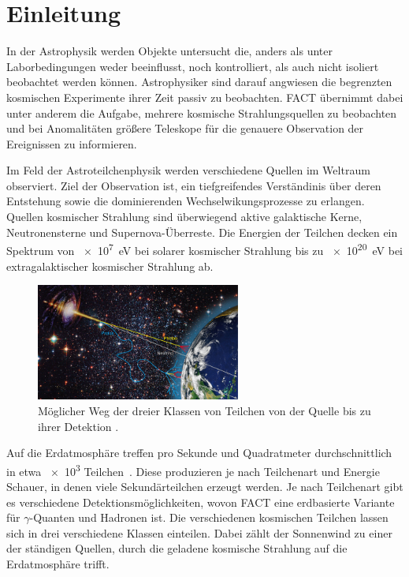 \chapter{Einleitung}
In der Astrophysik werden Objekte untersucht die, anders als unter Laborbedingungen weder beeinflusst, noch kontrolliert, als auch nicht isoliert beobachtet werden können.
Astrophysiker sind darauf angwiesen die begrenzten kosmischen Experimente ihrer Zeit passiv zu beobachten. 
FACT übernimmt dabei unter anderem die Aufgabe, mehrere kosmische Strahlungsquellen zu beobachten und bei Anomalitäten größere Teleskope für die genauere Observation der Ereignissen zu informieren. 

Im Feld der Astroteilchenphysik werden verschiedene Quellen im Weltraum observiert.
Ziel der Observation ist, ein tiefgreifendes Verständinis über deren Entstehung sowie die dominierenden Wechselwikungsprozesse zu erlangen. 
Quellen kosmischer Strahlung sind überwiegend aktive galaktische Kerne, Neutronensterne und Supernova-Überreste. 
Die Energien der Teilchen decken ein Spektrum von \SI{e7}{\electronvolt} bei solarer kosmischer Strahlung bis zu \SI{e20}{\electronvolt} bei extragalaktischer kosmischer Strahlung ab. 

\begin{figure}
  \centering
  \includegraphics[width=0.6\textwidth]{./images/sources-detection.jpg}
  \caption{Möglicher Weg der dreier Klassen von Teilchen von der Quelle bis zu ihrer Detektion \cite{overview-detec}.}
\end{figure}

Auf die Erdatmosphäre treffen pro Sekunde und Quadratmeter durchschnittlich in etwa \num{e3} Teilchen~\cite{gaisser}.
Diese produzieren je nach Teilchenart und Energie Schauer, in denen viele Sekundärteilchen erzeugt werden. 
Je nach Teilchenart gibt es verschiedene Detektionsmöglichkeiten, wovon FACT eine erdbasierte Variante für $\gamma$-Quanten und Hadronen ist. 
Die verschiedenen kosmischen Teilchen lassen sich in drei verschiedene Klassen einteilen. 
Dabei zählt der Sonnenwind zu einer der ständigen Quellen, durch die geladene kosmische Strahlung auf die Erdatmosphäre trifft.

